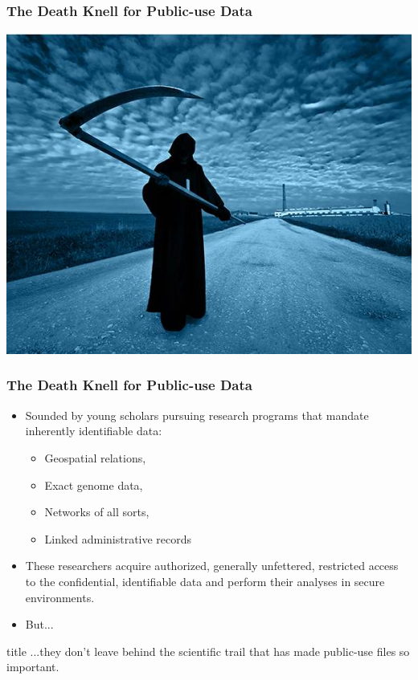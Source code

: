 \begin{frame}
\frametitle{The Death Knell for Public-use Data}

\centering
	\includegraphics[width=.9\textwidth]{deathknell.jpg}%

\end{frame}

\begin{frame}
	\frametitle{The Death Knell for Public-use Data}
\begin{itemize}
	\item Sounded by young scholars pursuing research
	programs that mandate inherently identifiable data:
			\begin{itemize}
				\item Geospatial relations,
				\item Exact genome data,
				\item Networks of all sorts,
				\item Linked administrative records
			\end{itemize}
			\item These researchers acquire authorized, generally unfettered, restricted access to the
			confidential, identifiable data and perform their analyses in secure
			environments.
\item But...

\end{itemize}
\end{frame}

\begin{frame}
	\begin{beamercolorbox}[sep=8pt,center]{title}
		 ...they don't leave behind the scientific trail that has
		made public-use files so important.
	\end{beamercolorbox}
\end{frame}


